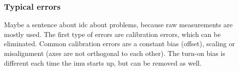 \subsubsection{Typical  errors}
Maybe a sentence about idc about problems, because raw measurements are mostly used.
The first type of errors are calibration errors, which can be eliminated.
Common calibration errors are a constant bias (offset), scaling or misalignment (axes are not orthogonal to each other).
The turn-on bias is different each time the \acrshort{imu} starts up, but can be removed as well.


